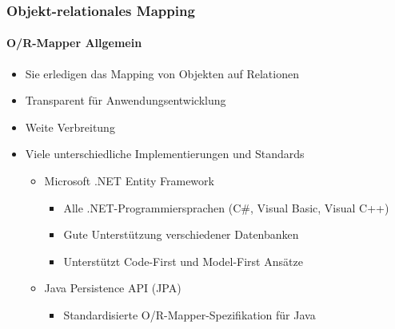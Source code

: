 \begin{frame}[t]\frametitle{Objekt-relationales Mapping}
	\framesubtitle{O/R-Mapper Allgemein}
  \onslide
	\begin{itemize}
		\item Sie erledigen das Mapping von Objekten auf Relationen 
		\item Transparent für Anwendungsentwicklung
		\item Weite Verbreitung\\[8pt]
		\pause
		\item Viele unterschiedliche Implementierungen und Standards 
		\begin{itemize}
			\item Microsoft .NET Entity Framework 
			\begin{itemize}
				\item Alle .NET-Programmiersprachen (C\#, Visual Basic, Visual C++)
				\item Gute Unterstützung verschiedener Datenbanken
				\item Unterstützt Code-First und Model-First Ansätze
			\end{itemize}
			\item Java Persistence API (JPA)
			\begin{itemize}
				\item Standardisierte O/R-Mapper-Spezifikation für Java
			\end{itemize}
		\end{itemize}
	\end{itemize}
\end{frame}


